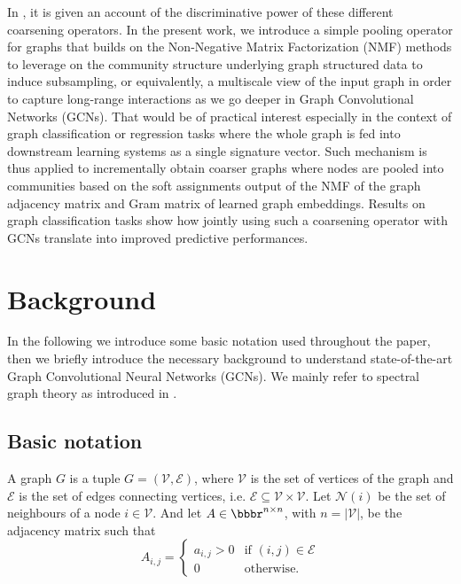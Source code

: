 \documentclass[runningheads]{llncs}
\begin{document}
In \cite{DBLP:journals/corr/abs-1810-00826}, it is given an account of the discriminative power of these different coarsening operators. In the present work, we introduce a simple pooling operator for graphs that builds on the Non-Negative Matrix Factorization (NMF) methods to leverage on the community structure underlying graph structured data to induce subsampling, or equivalently, a multiscale view of the input graph in order to capture long-range interactions as we go deeper in Graph Convolutional Networks (GCNs).
That would be of practical interest especially in the context of graph classification or regression tasks where the whole graph is fed into downstream learning systems as a single signature vector.
Such mechanism is thus applied to incrementally obtain coarser graphs where nodes are pooled into communities based on the soft assignments output of the NMF of the graph adjacency matrix and Gram matrix of learned graph embeddings.
Results on graph classification tasks show how jointly using such a coarsening operator with GCNs translate into improved predictive performances.

\section{Background}

In the following we introduce some basic notation used throughout the paper, then we briefly introduce the necessary background to understand state-of-the-art Graph Convolutional Neural Networks (GCNs). We mainly refer to spectral graph theory as introduced in \cite{Belkin:2001:LES:2980539.2980616,DBLP:journals/corr/BronsteinBLSV16,bruna}.

\subsection{Basic notation} A graph $G$ is a tuple $G = \left(\mathcal{V}, \mathcal{E}\right)$, where $\mathcal{V}$ is the set of vertices of the graph and $\mathcal{E}$ is the set of edges connecting vertices, i.e. $\mathcal{E} \subseteq \mathcal{V}\times \mathcal{V}$. Let $\mathcal{N}(i)$ be the set of neighbours of a node $i \in \mathcal{V}$. And let $A\in \bbbr^{n\times n}$, with $n = |\mathcal{V}|$, be the adjacency matrix such that
$$
	\displaystyle A_{i,j} = \left\{
									\begin{array}{ll}
										a_{i,j}>0  & \mbox{if } (i,j)\in\mathcal{E} \\
										0 & \mbox{otherwise. }
								    \end{array}
								\right.
$$
\end{document}
